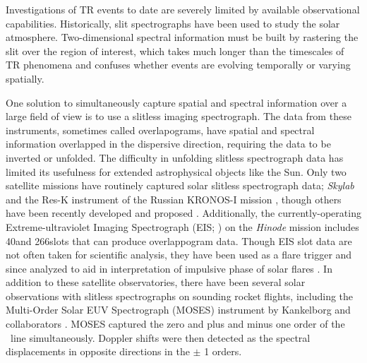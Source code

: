     
    Investigations of TR events to date are severely limited by available observational capabilities. 
    Historically, slit spectrographs have been used to study the solar atmosphere.   
    Two-dimensional spectral information must be built by rastering the slit over the region of interest, which takes much longer than the timescales of TR phenomena and confuses whether events are evolving temporally or varying spatially.  
    
    One solution to simultaneously capture spatial and spectral information over a large field of view is to use a slitless imaging spectrograph.  
    The data from these instruments, sometimes called overlapograms, have spatial and spectral information overlapped in the dispersive direction, requiring the data to be inverted or unfolded.
    The difficulty in unfolding slitless spectrograph data has limited its usefulness for extended astrophysical objects like the Sun. 
    Only two satellite missions have routinely captured solar slitless spectrograph data; {\it Skylab} \citep{Tousey1973} and the Res-K instrument of the Russian KRONOS-I mission \citep{Zhitnik1998}, though others have been recently developed and proposed \citep{winebarger2019,golub2020}. 
    Additionally, the currently-operating Extreme-ultraviolet Imaging Spectrograph (EIS; \citet{culhane2007}) on the {\it Hinode} mission \citep{kosugi2007} includes 40\arcsec and 266\arcsec slots that can produce overlappogram data.  
    Though EIS slot data are not often taken for scientific analysis, they have been used as a flare trigger and since analyzed to aid in interpretation of impulsive phase of solar flares \citep{harra2017,harra2020}.
    In addition to these satellite observatories, there have been several solar observations with slitless spectrographs on sounding rocket flights, including the Multi-Order Solar EUV Spectrograph (MOSES) instrument by Kankelborg and collaborators \citep{Kankelborg01,Fox10}.
    MOSES captured the zero and plus and minus one order of the \heii \ line simultaneously. 
    Doppler shifts were then detected as the spectral displacements in opposite directions in the $\pm$ 1 orders.
    
